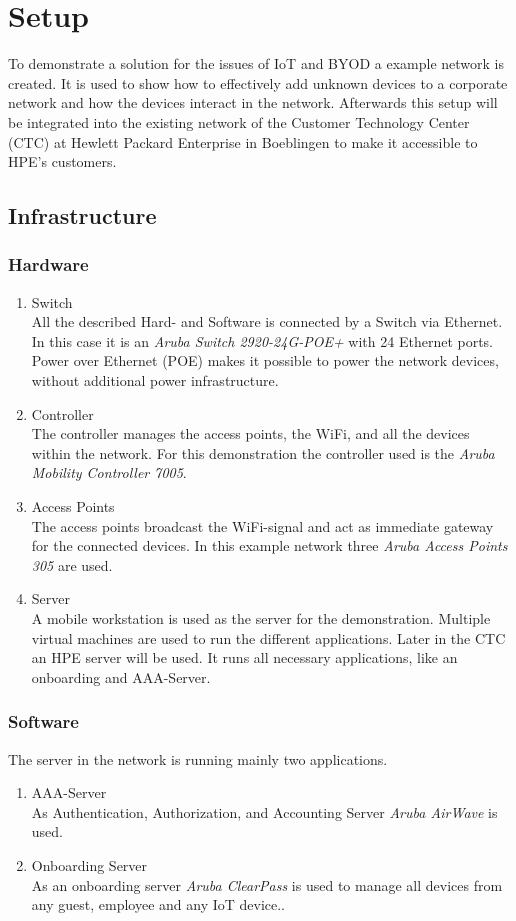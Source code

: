\chapter{Setup}
To demonstrate a solution for the issues of IoT and BYOD a example network is created. It is used to show how to effectively add unknown devices to a corporate network and how the devices interact in the network. Afterwards this setup will be integrated into the existing network of the Customer Technology Center (CTC) at Hewlett Packard Enterprise in Boeblingen to make it accessible to HPE's customers. 

\section{Infrastructure}
\subsection{Hardware}

\begin{enumerate}
	\item Switch \\
	All the described Hard- and Software is connected by a Switch via Ethernet. In this case it is an \textit{Aruba Switch 2920-24G-POE+} with 24 Ethernet ports. Power over Ethernet (POE) makes it possible to power the network devices, without additional power infrastructure.
	\item Controller \\
	The controller manages the access points, the WiFi, and all the devices within the network. For this demonstration the controller used is the \textit{Aruba Mobility Controller 7005}. 
	\item Access Points \\
	The access points broadcast the WiFi-signal and act as immediate gateway for the connected devices. In this example network three \textit{Aruba Access Points 305} are used.
	\item Server \\
	A mobile workstation is used as the server for the demonstration. Multiple virtual machines are used to run the different applications. Later in the CTC an HPE server will be used. It runs all necessary applications, like an onboarding and AAA-Server.
\end{enumerate}

\subsection{Software}
The server in the network is running mainly two applications. 
\begin{enumerate}
	\item AAA-Server \\
	As Authentication, Authorization, and Accounting Server \textit{Aruba AirWave} is used. 
	\item Onboarding Server \\
	As an onboarding server \textit{Aruba ClearPass} is used to manage all devices from any guest, employee and any IoT device.. 
\end{enumerate}


